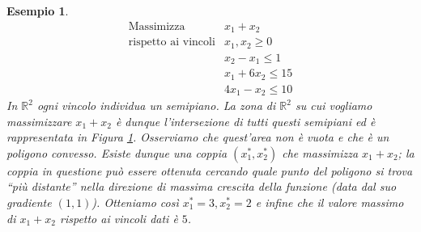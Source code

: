 \documentclass[italian, 12pt, reqno]{article}
\theoremstyle{myteo}
\newtheorem{example}[theorem]{Esempio}
\numberwithin{equation}{section}
\begin{document}
\begin{example}
  \label{es:problema_lineare}
  \begin{equation*}
    \begin{array}{ll}
      \text{Massimizza} & x_1 + x_2\\
      \text{rispetto ai vincoli} & x_1, x_2\geq 0\\
                        & x_2 - x_1 \leq 1\\
                        & x_1 + 6x_2 \leq 15\\
                        & 4x_1 - x_2 \leq 10
    \end{array}
  \end{equation*}
  In \(\mathbb{R}^2\) ogni vincolo individua un semipiano.
  La zona di \(\mathbb{R}^2\) su cui vogliamo massimizzare \(x_1+x_2\) è dunque l'intersezione di tutti questi semipiani ed è rappresentata in Figura \ref{fig:problema_lineare}.
  Osserviamo che quest'area non è vuota e che è un poligono convesso.
  Esiste dunque una coppia \((x_1^*,x_2^*)\) che massimizza \(x_1+x_2\); la coppia in questione può essere ottenuta cercando quale punto del poligono si trova ``più distante'' nella direzione di massima crescita della funzione (data dal suo gradiente \((1, 1)\)).
  Otteniamo così \(x_1^*=3, x_2^*=2\) e infine che il valore massimo di \(x_1+x_2\) rispetto ai vincoli dati è \(5\).

  \begin{figure}[h]
    \begin{center}
    \end{center}
    \caption{}
    \label{fig:problema_lineare}
  \end{figure}
\end{example}
\end{document}
